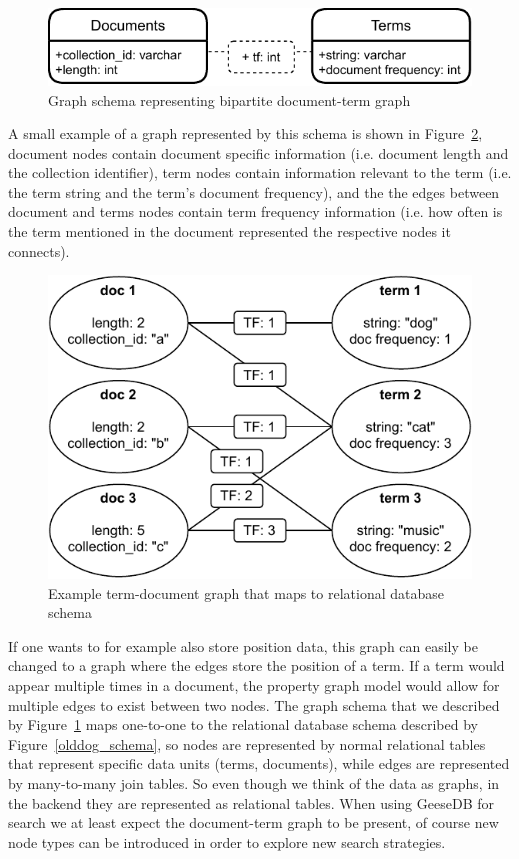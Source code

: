 \begin{figure}
	\centering
	\includegraphics[width=\linewidth]{./imgs/olddog-graph-schema.pdf}
	\caption{Graph schema representing bipartite document-term graph}
	\label{olddog-graph-schema}
\end{figure}
A small example of a graph represented by this schema is shown in Figure~\ref{example-olddog-graph}, document nodes contain document specific information (i.e. document length and the collection identifier), term nodes contain information relevant to the term (i.e. the term string and the term's document frequency), and the the edges between document and terms nodes contain term frequency information (i.e. how often is the term mentioned in the document represented the respective nodes it connects).
\begin{figure}
	\centering
	\includegraphics[width=\linewidth]{./imgs/example_olddog_graph.pdf}
	\caption{Example term-document graph that maps to relational database schema}
	\label{example-olddog-graph}
\end{figure}
If one wants to for example also store position data, this graph can easily be changed to a graph where the edges store the position of a term. If a term would appear multiple times in a document, the property graph model would allow for multiple edges to exist between two nodes. The graph schema that we described by Figure~\ref{olddog-graph-schema} maps one-to-one to the relational database schema described by Figure~\ref{olddog_schema}, so nodes are represented by normal relational tables that represent specific data units (terms, documents), while edges are represented by many-to-many join tables. So even though we think of the data as graphs, in the backend they are represented as relational tables. When using GeeseDB for search we at least expect the document-term graph to be present, of course new node types can be introduced in order to explore new search strategies. 

